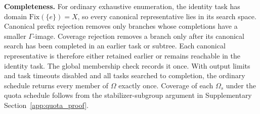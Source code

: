 \medskip
\noindent\textbf{Completeness.}
For ordinary exhaustive enumeration, the identity task has domain $\mathrm{Fix}(\{e\})=X$, so every canonical representative lies in its search space. Canonical prefix rejection removes only branches whose completions have a smaller $\Gamma$-image. Coverage rejection removes a branch only after its canonical search has been completed in an earlier task or subtree. Each canonical representative is therefore either retained earlier or remains reachable in the identity task. The global membership check records it once. With output limits and task timeouts disabled and all tasks searched to completion, the ordinary schedule returns every member of $\Omega$ exactly once. Coverage of each $\Omega_s$ under the quota schedule follows from the stabilizer-subgroup argument in Supplementary Section~\ref{app:quota_proof}.


